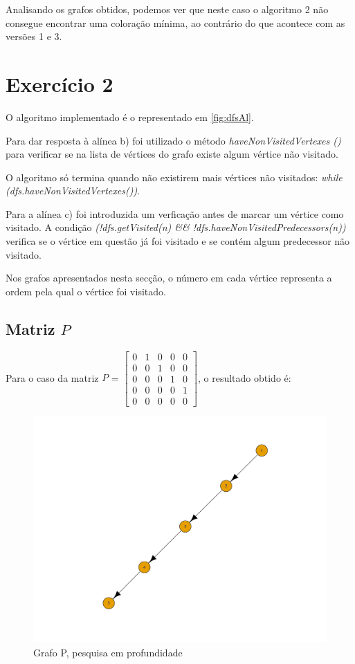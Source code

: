 \documentclass[a4paper,12pt]{report}
\begin{document}
Analisando os grafos obtidos, podemos ver que neste caso o algoritmo 2 não consegue encontrar uma coloração mínima, ao contrário do que acontece com as versões 1 e 3.

\section{Exercício 2}

O algoritmo implementado é o representado em \ref{fig:dfsAl}.

Para dar resposta à alínea b) foi utilizado o método \textit{haveNonVisitedVertexes ()} para verificar se na lista de vértices do grafo existe algum vértice não visitado. 

O algoritmo só termina quando não existirem mais vértices não visitados: \textit{while (dfs.haveNonVisitedVertexes())}.

Para a alínea c) foi introduzida um verficação antes de marcar um vértice como visitado. A condição \textit{(!dfs.getVisited(n) \&\& !dfs.haveNonVisitedPredecessors(n))} verifica se o vértice em questão já foi visitado e se contém algum predecessor não visitado.

Nos grafos apresentados nesta secção, o número em cada vértice representa a ordem pela qual o vértice foi visitado.

\subsection*{Matriz $P$}

Para o caso da matriz $P$ = $\begin{bmatrix}
    0&1&0&0&0\\
    0&0&1&0&0\\
    0&0&0&1&0\\
    0&0&0&0&1\\
    0&0&0&0&0
\end{bmatrix}$, o resultado obtido é:
\begin{figure}[H]
    \centering
        \includegraphics[scale=0.22]{img/dfsP.pdf}
    \caption{Grafo P, pesquisa em profundidade}
    \label{fig:dfsP}
\end{figure}
\end{document}
